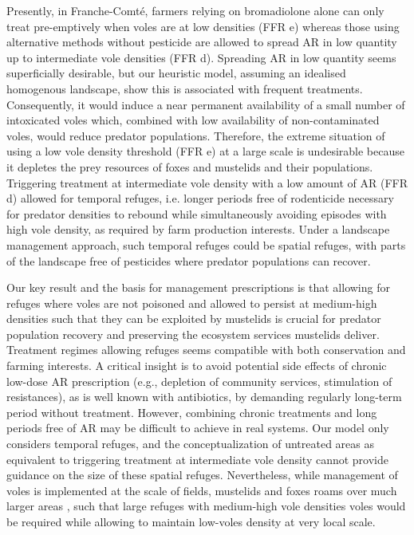 \documentclass[11pt]{article}
\begin{document}
Presently, in Franche-Comté, farmers relying on bromadiolone alone can only treat pre-emptively when voles are at low densities (FFR e) whereas those using alternative methods without pesticide are allowed to spread AR in low quantity up to intermediate vole densities (FFR d). Spreading AR in low quantity seems superficially desirable, but our heuristic model, assuming an idealised homogenous landscape, show this is associated with frequent treatments. Consequently, it would induce a near permanent availability of a small number of intoxicated voles which, combined with low availability of non-contaminated voles, would reduce predator populations. Therefore, the extreme situation of using a low vole density threshold (FFR e) at a large scale is undesirable because it depletes the prey resources of foxes and mustelids and their populations. Triggering treatment at intermediate vole density with a low amount of AR (FFR d) allowed for temporal refuges, i.e. longer periods free of rodenticide necessary for predator densities to rebound while simultaneously avoiding episodes with high vole density, as required by farm production interests. Under a landscape management approach, such temporal refuges could be spatial refuges, with parts of the landscape free of pesticides where predator populations can recover.

Our key result and the basis for management prescriptions is that allowing for refuges where voles are not poisoned and allowed to persist at medium-high densities such that they can be exploited by mustelids is crucial for predator population recovery and preserving the ecosystem services mustelids deliver.  Treatment regimes allowing refuges seems compatible with both conservation and farming interests. A critical insight is to avoid potential side effects of chronic low-dose AR prescription (e.g., depletion of community services, stimulation of resistances), as is well known with antibiotics, by demanding regularly long-term period without treatment. However, combining chronic treatments and long periods free of AR may be difficult to achieve in real systems. Our model only considers temporal refuges, and the conceptualization of untreated areas as equivalent to triggering treatment at intermediate vole density cannot provide guidance on the size of these spatial refuges. Nevertheless, while management of voles is implemented at the scale of fields, mustelids and foxes roams over much larger areas  \citep{King2006}, such that large refuges with medium-high vole densities voles would be required while allowing to maintain low-voles density at very local scale.
\end{document}
